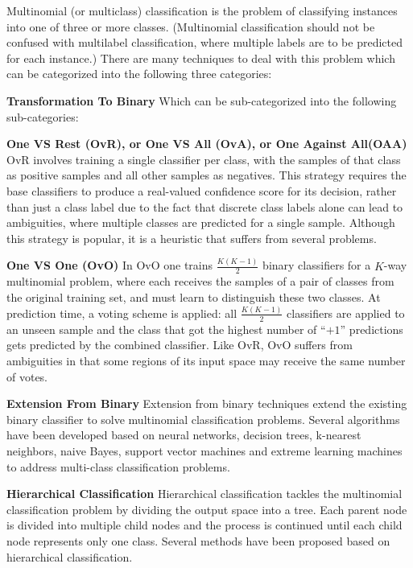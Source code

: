 Multinomial (or multiclass) classification is the problem of classifying instances into one of three or more classes.
(Multinomial classification should not be confused with multilabel classification, where multiple labels are to be
predicted for each instance.) There are many techniques to deal with this problem which can be categorized into the
following three categories:
\bit
\item \textbf{Transformation To Binary} Which can be sub-categorized into the following sub-categories:
\bit
\item \textbf{One VS Rest (OvR), or One VS All (OvA), or One Against All(OAA)} OvR involves training a single
classifier per class, with the samples of that class as positive samples and all other samples as negatives. This
strategy requires the base classifiers to produce a real-valued confidence score for its decision, rather than just a
class label due to the fact that discrete class labels alone can lead to ambiguities, where multiple classes are
predicted for a single sample. Although this strategy is popular, it is a heuristic that suffers from several problems.
\item \textbf{One VS One (OvO)} In OvO one trains $\frac{K (K - 1)}{2}$ binary classifiers for a $K$-way multinomial
problem, where each receives the samples of a pair of classes from the original training set, and must learn to
distinguish these two classes. At prediction time, a voting scheme is applied: all $\frac{K (K - 1)}{2}$ classifiers
are applied to an unseen sample and the class that got the highest number of ``$+1$'' predictions gets predicted by the
combined classifier. Like OvR, OvO suffers from ambiguities in that some regions of its input space may receive the
same number of votes.
\eit
\item \textbf{Extension From Binary} Extension from binary techniques extend the existing binary classifier to solve
multinomial classification problems. Several algorithms have been developed based on neural networks, decision trees,
k-nearest neighbors, naive Bayes, support vector machines and extreme learning machines to address multi-class
classification problems.
\item \textbf{Hierarchical Classification} Hierarchical classification tackles the multinomial classification problem
by dividing the output space into a tree. Each parent node is divided into multiple child nodes and the process is
continued until each child node represents only one class. Several methods have been proposed based on hierarchical
classification.
\eit


